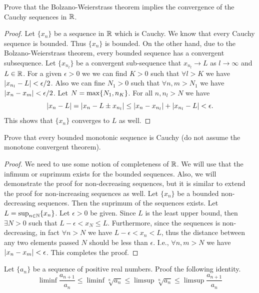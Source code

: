 \begin{problem}
	Prove that the Bolzano-Weierstrass theorem implies the convergence of the Cauchy sequences in $\mathbb{R}$.
\end{problem}

\begin{proof}
	Let $\{x_n\}$ be a sequence in $\mathbb{R}$ which is Cauchy. We know that every Cauchy sequence is bounded. Thus $\{x_n\}$ is bounded. On the other hand, due to the Bolzano-Weierstrass theorem, every bounded sequence has a convergent subsequence. Let $\{x_{n_l}\}$ be a convergent sub-sequence that $x_{n_l} \to L$ as $l \to \infty$ and $L \in \mathbb{R}$. For a given $\epsilon>0$ we we can find $K >0$ such that $\forall l > K$ we have $|x_{n_l} - L| < \epsilon/2$. Also we can fine $N_1>0$ such that $\forall n,m > N_1$ we have $|x_n - x_m| < \epsilon/2$. Let $N = \max\{N_1, n_K\}$. For all $n, n_l > N$ we have
	\[ |x_n - L| = |x_n - L \pm x_{n_l}| \leq |x_n - x_{n_l}| + |x_{n_l} - L| < \epsilon. \]
	This shows that $\{x_n\}$ converges to $L$ as well.
\end{proof}

\begin{problem}
	Prove that every bounded monotonic sequence is Cauchy (do not assume the monotone convergent theorem).
\end{problem}
\begin{proof}
	We need to use some notion of completeness of $\mathbb{R}$. We will use that the infimum or suprimum exists for the bounded sequences. Also, we will demonstrate the proof for non-decreasing sequences, but it is similar to extend the proof for non-increasing sequences as well. Let $\{x_n\}$ be a bounded non-decreasing sequences. Then the suprimum of the sequences exists. Let $L = \sup_{n\in\mathbb{N}}\{x_n\}$. Let $\epsilon>0$ be given. Since $L$ is the least upper bound, then $\exists N>0$ such that $L-\epsilon < x_N \leq L$. Furthermore, since the sequences is non-decreasing, in fact $\forall n>N$ we have $L- \epsilon < x_n < L$, thus the distance between any two elements passed $N$ should be less than $\epsilon$. I.e., $\forall n,m > N$ we have $|x_n - x_m| < \epsilon$. This completes the proof.
\end{proof}

\begin{problem}
	Let $\{a_n\}$ be a sequence of positive real numbers. Proof the following identity.
	\[ \liminf \frac{a_{n+1}}{a_n} \leq \liminf \sqrt[n]{a_n} \leq \limsup \sqrt[n]{a_n} \leq \limsup \frac{a_{n+1}}{a_n} \]
\end{problem}


